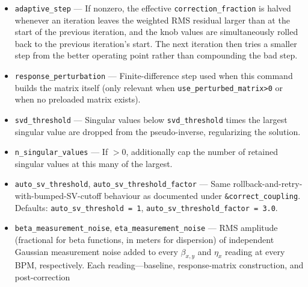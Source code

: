 \documentclass[11pt]{article}
\begin{document}
\begin{itemize}
\begin{itemize}
  \item 0 (default): build the matrix once during \verb|correct_lattice|
    setup and reuse it for all iterations and all simulation steps.  Cheap;
    accurate when the knobs are weak and the optics change very little.
  \item 1: rebuild the matrix at the start of each call to the per-step
    correction routine (once per simulation step).
  \item $>1$: rebuild before each iteration within a call.  Most accurate
    far from the design, but $\sim n_{\mathrm{iter}} \times n_{\mathrm{knobs}}$
    extra twiss recomputations per step.
  \end{itemize}
  If a \verb|compute_lattice_response_matrix| or
  \verb|load_lattice_response_matrix| command has already provided a
  matrix, this control is honored on top of the preloaded matrix.
\item \verb|adaptive_step| --- If nonzero, the effective
  \verb|correction_fraction| is halved whenever an iteration leaves the
  weighted RMS residual larger than at the start of the previous iteration,
  and the knob values are simultaneously rolled back to the previous
  iteration's start.  The next iteration then tries a smaller step from
  the better operating point rather than compounding the bad step.
\item \verb|response_perturbation| --- Finite-difference step used when
  this command builds the matrix itself (only relevant when
  \verb|use_perturbed_matrix>0| or when no preloaded matrix exists).
\item \verb|svd_threshold| --- Singular values below
  \verb|svd_threshold| times the largest singular value are dropped from
  the pseudo-inverse, regularizing the solution.
\item \verb|n_singular_values| --- If $>0$, additionally cap the number of
  retained singular values at this many of the largest.
\item \verb|auto_sv_threshold|, \verb|auto_sv_threshold_factor| --- Same
  rollback-and-retry-with-bumped-SV-cutoff behaviour as documented under
  \verb|&correct_coupling|.  Defaults: \verb|auto_sv_threshold = 1|,
  \verb|auto_sv_threshold_factor = 3.0|.
\item \verb|beta_measurement_noise|, \verb|eta_measurement_noise| --- RMS
  amplitude (fractional for beta functions, in meters for dispersion) of independent Gaussian measurement noise added to
  every $\beta_{x,y}$ and $\eta_x$ reading at every BPM, respectively.  Each
  reading---baseline, response-matrix construction, and post-correction

\end{itemize}
\end{document}
